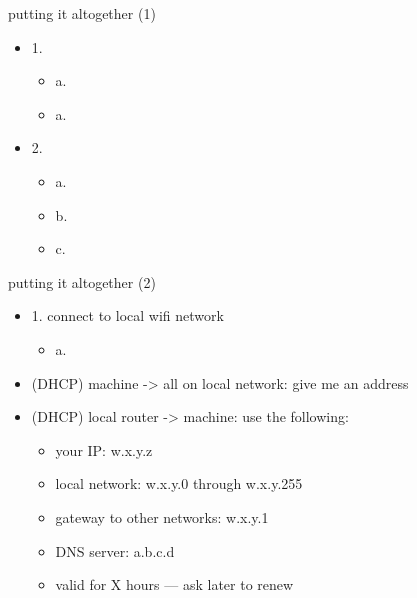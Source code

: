 \begin{frame}{putting it altogether (1)}
    \begin{itemize}
    \item 1. 
        \begin{itemize}
        \item<2-> a. 
        \item<2-> a. 
        \end{itemize}
    \item 2. 
        \begin{itemize}
        \item<3-> a. 
        \item<3-> b. 
        \item<3-> c. 
        \end{itemize}
    \end{itemize}
\end{frame}


\begin{frame}{putting it altogether (2)}
    \begin{itemize}
    \item 1. connect to local wifi network
        \begin{itemize}
        \item a. 
        \end{itemize}
    \vspace{.5cm}
    \item<2-> (DHCP) machine -> all on local network: give me an address
    \item<2-> (DHCP) local router -> machine: use the following: 
        \begin{itemize}
        \item your IP: w.x.y.z
        \item local network: w.x.y.0 through w.x.y.255
        \item gateway to other networks: w.x.y.1
        \item DNS server: a.b.c.d
        \item valid for X hours --- ask later to renew
        \end{itemize}
    \end{itemize}
\end{frame}

